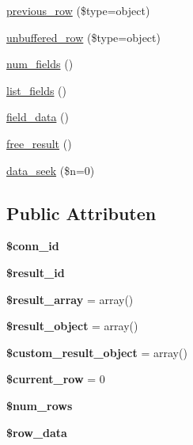 \begin{DoxyCompactItemize}
\item 
\mbox{\hyperlink{class_c_i___d_b__result_a458567a19d160a814b41b2964ec192ce}{previous\+\_\+row}} (\$type=\textquotesingle{}object\textquotesingle{})
\item 
\mbox{\hyperlink{class_c_i___d_b__result_a75f3fff759e63b51c93bb1588e9b0a77}{unbuffered\+\_\+row}} (\$type=\textquotesingle{}object\textquotesingle{})
\item 
\mbox{\hyperlink{class_c_i___d_b__result_af831bf363e4d7d661a717a4932af449d}{num\+\_\+fields}} ()
\item 
\mbox{\hyperlink{class_c_i___d_b__result_a50b54eb4ea7cfd039740f532988ea776}{list\+\_\+fields}} ()
\item 
\mbox{\hyperlink{class_c_i___d_b__result_a84bffd65e53902ade1591716749a33e3}{field\+\_\+data}} ()
\item 
\mbox{\hyperlink{class_c_i___d_b__result_aad2d98d6beb3d6095405356c6107b473}{free\+\_\+result}} ()
\item 
\mbox{\hyperlink{class_c_i___d_b__result_a8255ae91816e4206e29eb7581c5af0f1}{data\+\_\+seek}} (\$n=0)
\end{DoxyCompactItemize}
\subsection*{Public Attributen}
\begin{DoxyCompactItemize}
\item 
\mbox{\label{class_c_i___d_b__result_a16c23f1dcbfed2f2759f5e54f604106d}} 
{\bfseries \$conn\+\_\+id}
\item 
\mbox{\label{class_c_i___d_b__result_a0ebacb40e3b6f8bf33d3de0f2cc71474}} 
{\bfseries \$result\+\_\+id}
\item 
\mbox{\label{class_c_i___d_b__result_a153392b3ec395131d32c70cda855698e}} 
{\bfseries \$result\+\_\+array} = array()
\item 
\mbox{\label{class_c_i___d_b__result_aa292cbb3dbb8c654cb4f6c61f250efd3}} 
{\bfseries \$result\+\_\+object} = array()
\item 
\mbox{\label{class_c_i___d_b__result_a680c2e11eeb189d9bb8ba2a552766b7b}} 
{\bfseries \$custom\+\_\+result\+\_\+object} = array()
\item 
\mbox{\label{class_c_i___d_b__result_a2ec3a266ee95cda75cdbb71bc9ee1b53}} 
{\bfseries \$current\+\_\+row} = 0
\item 
\mbox{\label{class_c_i___d_b__result_ac926549b713e71c5f5fd63999cebfb8c}} 
{\bfseries \$num\+\_\+rows}
\item 
\mbox{\label{class_c_i___d_b__result_a335b4c27a1529df9e484e044e470ec07}} 
{\bfseries \$row\+\_\+data}
\end{DoxyCompactItemize}
